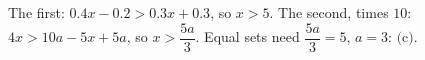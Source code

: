 The first: $0.4x-0.2>0.3x+0.3$, so $x>5$. The second, times $10$: $4x>10a-5x+5a$, so $x>\dfrac{5a}{3}$. Equal sets need $\dfrac{5a}{3}=5$, $a=3$: $\boxed{\text{(c)}}$.
